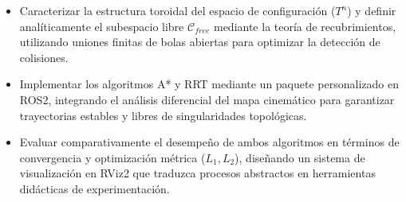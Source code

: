 \begin{itemize}
\item Caracterizar la estructura toroidal del espacio de configuración ($T^n$) y 
definir analíticamente el subespacio libre $\mathcal{C}_{free}$ mediante la teoría de 
recubrimientos, utilizando uniones finitas de bolas abiertas para optimizar la detección 
de colisiones.

\item Implementar los algoritmos A* y RRT mediante un paquete personalizado 
en ROS2, integrando el análisis diferencial del mapa cinemático para garantizar 
trayectorias estables y libres de singularidades topológicas.

\item Evaluar comparativamente el desempeño de ambos algoritmos en términos de 
convergencia y optimización métrica ($L_1, L_2$), diseñando un sistema de 
visualización en RViz2 que traduzca procesos abstractos en herramientas 
didácticas de experimentación.

\end{itemize}
